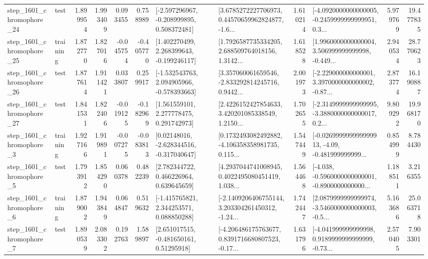 \begin{tabular}{llrrrrllrlrr}
 step\_1601\_chromophore\_24 &      test &      1.899954 &    1.993409 &      0.093455 &  0.758989 &   [-2.597296967, -0.208999895, 0.508372481] &  [3.6785272227706973, 0.44570659962824877, -1.6... &       1.610214 &  [-4.0920000000000005, -0.2459999999999951, 0.3... &            5.979769 &         19.477835 \\
 step\_1601\_chromophore\_25 &  training &      1.872770 &    1.827016 &     -0.045754 & -0.405770 &    [1.402270499, 2.268399643, -0.199246117] &  [1.7926587735334205, 2.688509764018156, 1.3142... &       1.618528 &  [1.9960000000000004, 3.506999999999998, -0.449... &            2.940534 &         28.770623 \\
 step\_1601\_chromophore\_26 &      test &      1.877614 &    1.911421 &      0.033807 &  0.259917 &   [-1.532543763, 2.094905966, -0.578393663] &  [3.357060061659546, -2.833292814245716, 0.9442... &       2.001973 &  [-2.229000000000001, 3.3970000000000002, -0.87... &            2.873774 &         16.190887 \\
 step\_1601\_chromophore\_27 &      test &      1.841531 &    1.822406 &     -0.019125 & -0.182969 &     [1.561559101, 2.277778475, 0.291742973] &  [2.4226152427854633, 3.420201085338549, 1.2150... &       1.702655 &  [-2.3149999999999995, -3.3880000000000017, 0.2... &            9.809292 &         19.968170 \\
  step\_1601\_chromophore\_3 &  training &      1.927166 &    1.919891 &     -0.007275 & -0.083813 &    [0.02148016, -2.628344516, -0.317040647] &  [0.1732493082492882, -4.106358358981735, 0.115... &       1.547449 &  [-0.026999999999999913, -4.09, -0.481999999999... &            0.854999 &          8.784430 \\
  step\_1601\_chromophore\_5 &      test &      1.793912 &    1.854290 &      0.060378 &  0.482239 &     [2.782344722, 0.466226964, 0.639645659] &  [4.2937044741008945, 0.4022495080451419, 1.038... &       1.564468 &  [-4.038, -0.5960000000000001, -0.8900000000000... &            1.188511 &          3.216355 \\
  step\_1601\_chromophore\_6 &  training &      1.879002 &    1.943849 &      0.064847 &  0.519632 &    [-1.415765821, 2.344253571, 0.088850288] &  [-2.1409206406755144, 3.203304261450312, -1.24... &       1.742447 &  [2.0879999999999974, -3.5460000000000003, -0.5... &            5.163686 &         25.063718 \\
  step\_1601\_chromophore\_7 &      test &      1.890539 &    2.083302 &      0.192763 &  1.589897 &     [2.651017515, -0.481650161, 0.51295918] &  [-4.206486175763677, 0.8391716680807523, -0.17... &       1.631796 &  [-4.041999999999998, 0.9189999999999999, -0.73... &            2.570405 &          7.903301 \\

\end{tabular}

